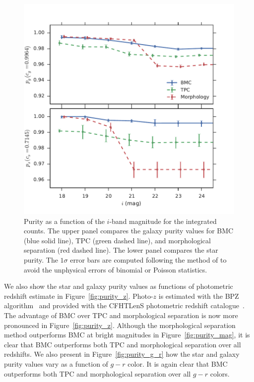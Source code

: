 \documentclass[useAMS,usenatbib]{mn2e}
\begin{document}
\begin{figure}
  \centering
  \includegraphics[width=\columnwidth]{figures/purity_mag_integrated.pdf}
  \caption{Purity as a function of the $i$-band magnitude
           for the integrated counts.
           The upper panel compares
           the galaxy purity values for BMC (blue solid line),
           TPC (green dashed line), and 
           morphological separation (red dashed line).
           The lower panel compares the star purity.
           The $1 \sigma$ error bars are computed following the method
           of \citet{paterno2004calculating} to avoid the unphysical
           errors of binomial or Poisson statistics.}
  \label{fig:purity_mag_integrated}
\end{figure}


We also show the star and galaxy purity values as functions of
photometric redshift estimate in Figure~\ref{fig:purity_z}.
Photo-$z$ is estimated with
the \textsc{BPZ} algorithm~\citep{benitez2000bayesian}
and provided with
the CFHTLenS photometric redshift catalogue~\citep{hildebrandt2012cfhtlens}.
The advantage of BMC over TPC and morphological separation is
now more pronounced in Figure~\ref{fig:purity_z}.
Although the morphological separation method outperforms BMC
at bright magnitudes in Figure~\ref{fig:purity_mag},
it is clear that BMC outperforms
both TPC and morphological separation over all redshifts.
We also present in Figure~\ref{fig:purity_g_r}
how the star and galaxy purity values vary
as a function of $g-r$ color.
It is again clear that BMC outperforms
both TPC and morphological separation over all $g-r$ colors.
\end{document}
